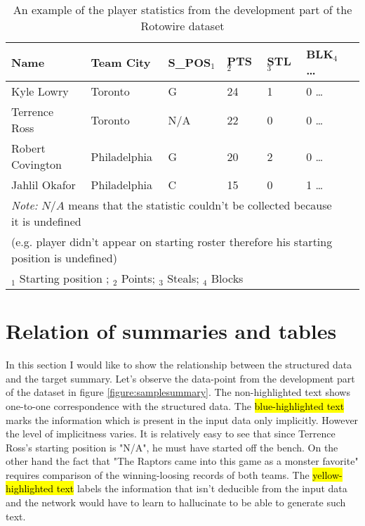 \begin{table}[h!]
    \begin{tabular}{lllllll}
        \toprule
        Name             & Team City    & S\_POS$_1$ & PTS$_2$ & STL$_3$ & BLK$_4$        \dots \\
        \midrule
        Kyle Lowry       & Toronto      & G         & 24  & 1   & 0       \dots \\
        Terrence Ross    & Toronto      & N/A       & 22  & 0   & 0        \dots \\
        Robert Covington & Philadelphia & G         & 20  & 2   & 0        \dots \\
        Jahlil Okafor    & Philadelphia & C         & 15  & 0   & 1        \dots \\
        \bottomrule
        \multicolumn{6}{l}{\footnotesize \textit{Note:} $N/A$ means that the statistic couldn't be collected because it is undefined} \\
        \multicolumn{6}{l}{\footnotesize (e.g. player didn't appear on starting roster therefore his starting position is undefined)} \\
        \multicolumn{6}{l}{\footnotesize $_1$ Starting position ; $_2$ Points; $_3$ Steals; $_4$ Blocks}
    \end{tabular}
    \caption{\centering An example of the player statistics from the development part of the Rotowire dataset}\label{tab_player_stats}
\end{table}

\section{Relation of summaries and tables}

In this section I would like to show the relationship between the structured data and the target summary. Let's observe the data-point from the development part of the dataset in figure \ref{figure:samplesummary}. The non-highlighted text shows one-to-one correspondence with the structured data. The  \hl{blue-highlighted text} marks the information which is present in the input data only implicitly. However the level of implicitness varies. It is relatively easy to see that since Terrence Ross's starting position is "N/A", he must have started off the bench. On the other hand the fact that "The Raptors came into this game as a monster favorite" requires comparison of the winning-loosing records of both teams. The  \hl{yellow-highlighted text} labels the information that isn't deducible from the input data and the network would have to learn to hallucinate to be able to generate such text.


